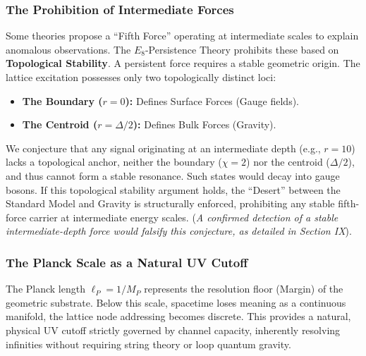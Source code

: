 \subsubsection{The Prohibition of Intermediate Forces}
Some theories propose a ``Fifth Force'' operating at intermediate scales to explain anomalous observations. The $E_8$-Persistence Theory prohibits these based on \textbf{Topological Stability}. A persistent force requires a stable geometric origin. The lattice excitation possesses only two topologically distinct loci:
\begin{itemize}
    \item \textbf{The Boundary ($r=0$):} Defines Surface Forces (Gauge fields).
    \item \textbf{The Centroid ($r=\Delta/2$):} Defines Bulk Forces (Gravity).
\end{itemize}
We conjecture that any signal originating at an intermediate depth (e.g., $r=10$) lacks a topological anchor, neither the boundary ($\chi=2$) nor the centroid ($\Delta/2$), and thus cannot form a stable resonance. Such states would decay into gauge bosons. If this topological stability argument holds, the ``Desert'' between the Standard Model and Gravity is structurally enforced, prohibiting any stable fifth-force carrier at intermediate energy scales. (\textit{A confirmed detection of a stable intermediate-depth force would falsify this conjecture, as detailed in Section IX}).

\subsubsection{The Planck Scale as a Natural UV Cutoff}
The Planck length $\ell_P = 1/M_P$ represents the resolution floor (Margin) of the geometric substrate. Below this scale, spacetime loses meaning as a continuous manifold, the lattice node addressing becomes discrete. This provides a natural, physical UV cutoff strictly governed by channel capacity, inherently resolving infinities without requiring string theory or loop quantum gravity.
